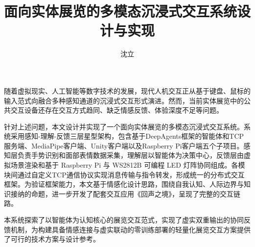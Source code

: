 \documentclass[bachelor]{njupthesis}
\title{面向实体展览的多模态沉浸式交互系统\newline 设计与实现}
\author{沈立}
\begin{document}
\makecover

\begin{chineseabstract}
随着虚拟现实、人工智能等数字技术的发展，现代人机交互正从基于键盘、鼠标的输入范式向融合多种感知通道的沉浸式交互形式演进。然而，当前实体展览中的公共交互设备还存在交互方式趋同、缺乏情感反馈、体验深度不足等问题。

针对上述问题，本文设计并实现了一个面向实体展览的多模态沉浸式交互系统。系统采用感知-理解-反馈三层星型架构，包含基于DeepAgents框架的智能体和TCP服务端、MediaPipe客户端、Unity客户端以及Raspberry Pi客户端五个子项目。感知层负责手势识别和面部表情数据采集，理解层以智能体为决策中心，反馈层由虚拟场景渲染和基于 Raspberry Pi 与 WS2812B 可编程 LED 灯阵协同组成。各模块间通过自定义TCP通信协议实现消息传输与指令转发，形成统一的分布式交互框架。为验证框架能力，本文基于情感化设计思路，围绕自我认知、人际边界与知识接纳的命题，进一步开发了配套交互应用《回声之境》，呈现了完整的交互链路。

本系统探索了以智能体为认知核心的展览交互范式，实现了虚实双重输出的协同反馈机制，为构建具备情感连接与虚实联动的零训练部署的轻量化展览交互方案提供了可行的技术方案与设计参考。

\end{chineseabstract}
\end{document}

